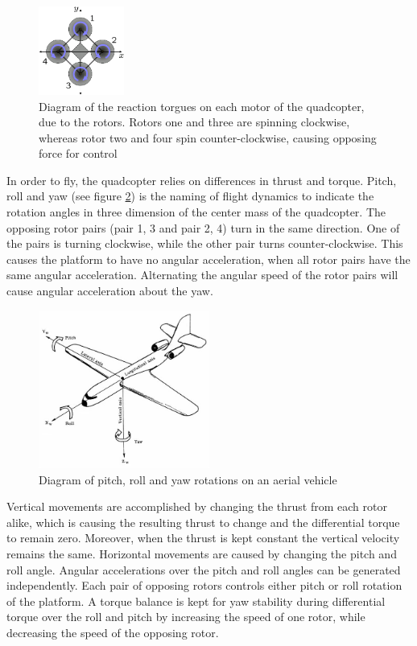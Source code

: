 \documentclass[a4paper]{article}
\begin{document}
\begin{appendices}
\begin{figure}[!ht]
	\centering
	\includegraphics[width=0.25\textwidth]{images/quadcopter.png}
	\caption{Diagram of the reaction torgues on each motor of the quadcopter, due to the rotors. Rotors one and three are spinning clockwise, whereas rotor two and four spin counter-clockwise, causing opposing force for control}
	\label{quadcopter}
\end{figure}

In order to fly, the quadcopter relies on differences in thrust and torque. Pitch, roll and yaw (see figure \ref{plane}) is the naming of flight dynamics to indicate the rotation angles in three dimension of the center mass of the quadcopter. The opposing rotor pairs (pair 1, 3 and pair 2, 4) turn in the same direction. One of the pairs is turning clockwise, while the other pair turns counter-clockwise. This causes the platform to have no angular acceleration, when all rotor pairs have the same angular acceleration. Alternating the angular speed of the rotor pairs will cause angular acceleration about the yaw.

\begin{figure}[!ht]
	\centering
	\includegraphics[width=0.5\textwidth]{images/plane.jpg}
	\caption{Diagram of pitch, roll and yaw rotations on an aerial vehicle}
	\label{plane}
\end{figure}

Vertical movements are accomplished by changing the thrust from each rotor alike, which is causing the resulting thrust to change and the differential torque to remain zero. Moreover, when the thrust is kept constant the vertical velocity remains the same. Horizontal movements are caused by changing the pitch and roll angle. Angular accelerations over the pitch and roll angles can be generated independently. Each pair of opposing rotors controls either pitch or roll rotation of the platform. A torque balance is kept for yaw stability during differential torque over the roll and pitch by increasing the speed of one rotor, while decreasing the speed of the opposing rotor.


\end{appendices}
\end{document}
